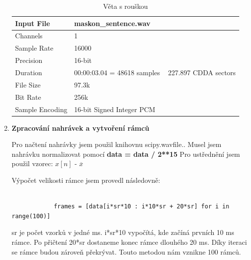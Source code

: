 \documentclass[a4paper]{article}
\begin{document}
\begin{enumerate}
        \newpage
            \begin{table}[!ht]
                \renewcommand{\arraystretch}{1.5}
                \centering
                \begin{tabular}{|l|l|}
                \hline
                    Input File & maskon\_sentence.wav \\ \hline
                    Channels & 1\\ \hline
                    Sample Rate & 16000\\ \hline
                    Precision & 16-bit\\ \hline
                    Duration & 00:00:03.04 = 48618 samples ~ 227.897 CDDA sectors\\ \hline
                    File Size & 97.3k\\ \hline
                    Bit Rate & 256k\\ \hline
                    Sample Encoding & 16-bit Signed Integer PCM\\
                \hline
                \end{tabular}
                \caption{Věta s rouškou}
                \label{tab:mask_onf_sentence}
            \end{table}
        \item \textbf{Zpracování nahrávek a vytvoření rámců} 
        
        \vspace{0.25cm}
        
        Pro načtení nahrávky jsem použil knihovnu scipy.wavfile.. \newline
        Musel jsem nahrávku normalizovat pomocí \textbf{data = data / 2**15} \newline
        Pro ustřednění jsem použil vzorec: $x[n]$ - $\overline{x}$
        
        \vspace{0.25cm}
        
        Výpočet velikosti rámce jsem provedl následovně:
        \begin{verbatim}
          
            frames = [data[i*sr*10 : i*10*sr + 20*sr] for i in range(100)]
        \end{verbatim}
        sr je počet vzorků v jedné ms. i*sr*10 vypočítá, kde začíná prvních 10 ms rámce. Po přičtení 20*sr dostaneme konec rámce dlouhého 20 ms. Díky iteraci se rámce budou zároveň překrývat. Touto metodou nám vznikne 100 rámců.
        

\end{enumerate}
\end{document}
